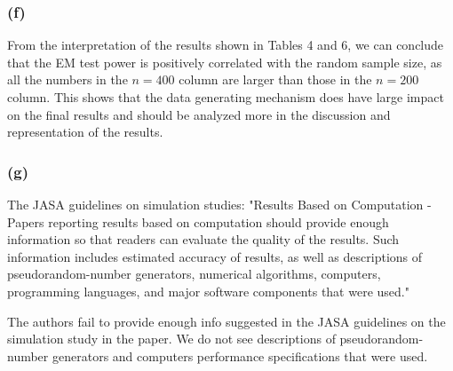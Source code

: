 \documentclass{article}
\begin{document}
\subsubsection*{(f)}

\hspace{12 pt} From the interpretation of the results shown in Tables 4 and 6, we can conclude that the EM test power is positively 
correlated with the random sample size, as all the numbers in the $n=400$ column are larger than those in the $n=200$
column. This shows that the data generating mechanism does have large impact on the final results and should be 
analyzed more in the discussion and representation of the results.


\subsubsection*{(g)}

\hspace{12 pt} The JASA guidelines on simulation studies:
"Results Based on Computation - Papers reporting results based on computation should provide
enough information so that readers can evaluate the quality of the results. Such information
includes estimated accuracy of results, as well as descriptions of pseudorandom-number generators,
numerical algorithms, computers, programming languages, and major software components
that were used."

The authors fail to provide enough info suggested in the JASA guidelines on the simulation study in the paper. 
We do not see descriptions of pseudorandom-number generators and computers performance specifications that were used.
\end{document}
